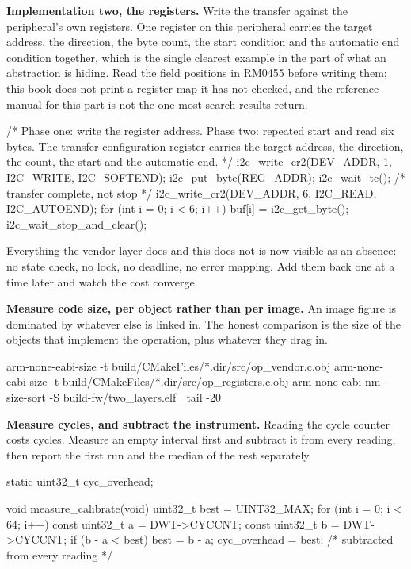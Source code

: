 \begin{steps}
\item \textbf{Implementation two, the registers.} Write the transfer against the
peripheral's own registers. One register on this peripheral carries the target
address, the direction, the byte count, the start condition and the automatic
end condition together, which is the single clearest example in the part of what
an abstraction is hiding. Read the field positions in RM0455 before writing
them; this book does not print a register map it has not checked, and the
reference manual for this part is not the one most search results return.
\begin{ccode}
/* Phase one: write the register address. Phase two: repeated start and
   read six bytes. The transfer-configuration register carries the target
   address, the direction, the count, the start and the automatic end. */
i2c_write_cr2(DEV_ADDR, 1, I2C_WRITE, I2C_SOFTEND);
i2c_put_byte(REG_ADDR);
i2c_wait_tc();                       /* transfer complete, not stop */
i2c_write_cr2(DEV_ADDR, 6, I2C_READ, I2C_AUTOEND);
for (int i = 0; i < 6; i++) buf[i] = i2c_get_byte();
i2c_wait_stop_and_clear();
\end{ccode}
Everything the vendor layer does and this does not is now visible as an absence:
no state check, no lock, no deadline, no error mapping. Add them back one at a
time later and watch the cost converge.

\item \textbf{Measure code size, per object rather than per image.} An image
figure is dominated by whatever else is linked in. The honest comparison is the
size of the objects that implement the operation, plus whatever they drag in.
\begin{shellcode}
arm-none-eabi-size -t build/CMakeFiles/*.dir/src/op_vendor.c.obj
arm-none-eabi-size -t build/CMakeFiles/*.dir/src/op_registers.c.obj
arm-none-eabi-nm --size-sort -S build-fw/two_layers.elf | tail -20
\end{shellcode}

\item \textbf{Measure cycles, and subtract the instrument.} Reading the cycle
counter costs cycles. Measure an empty interval first and subtract it from every
reading, then report the first run and the median of the rest separately.
\begin{ccode}
static uint32_t cyc_overhead;

void measure_calibrate(void)
{
    uint32_t best = UINT32_MAX;
    for (int i = 0; i < 64; i++) {
        const uint32_t a = DWT->CYCCNT;
        const uint32_t b = DWT->CYCCNT;
        if (b - a < best) best = b - a;
    }
    cyc_overhead = best;              /* subtracted from every reading */
}


\end{ccode}
\end{steps}
